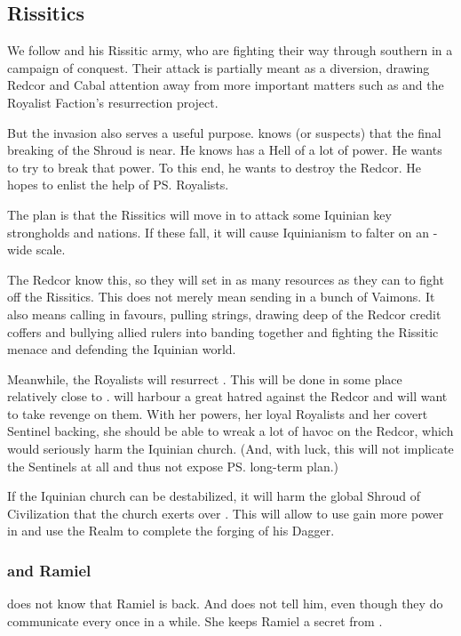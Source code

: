 \begin{garbage}
\subsection{Rissitics}
We follow \Narkiza{} and his Rissitic army, who are fighting their way through southern \Velcad{} in a campaign of conquest. 
Their attack is partially meant as a diversion, drawing Redcor and Cabal attention away from more important matters such as \Nithdornazsh{} and the Royalist Faction's resurrection project. 

But the invasion also serves a useful purpose. 
\Secherdamon{} knows (or suspects) that the final breaking of the Shroud is near. 
He knows \iquin{} has a Hell of a lot of power. 
He wants to try to break that power. 
To this end, he wants to destroy the Redcor. 
He hopes to enlist the help of \ps{\Shiaraid} Royalists. 

The plan is that the Rissitics will move in to attack some Iquinian key strongholds and nations. 
If these fall, it will cause Iquinianism to falter on an \Azmith-wide scale. 

The Redcor know this, so they will set in as many resources as they can to fight off the Rissitics. 
This does not merely mean sending in a bunch of Vaimons. 
It also means calling in favours, pulling strings, drawing deep of the Redcor credit coffers and bullying allied rulers into banding together and fighting the Rissitic menace and defending the Iquinian world.

Meanwhile, the Royalists will resurrect \Shiaraid. 
This will be done in some place relatively close to \Redce. 
\Shiaraid{} will harbour a great hatred against the Redcor and will want to take revenge on them. 
With her \sathariah{} powers, her loyal Royalists and her covert Sentinel backing, she should be able to wreak a lot of havoc on the Redcor, which would seriously harm the Iquinian church. 
(And, with luck, this will not implicate the Sentinels at all and thus not expose \ps{\Secherdamon} long-term plan.)

If the Iquinian church can be destabilized, it will harm the global Shroud of Civilization that the church exerts over \Azmith. 
This will allow \Secherdamon{} to use gain more power in \Azmith{} and use the Realm to complete the forging of his Dagger. 





\subsubsection{\Secherdamon{} and Ramiel}
\Secherdamon{} does not know that Ramiel is back. 
And \Shiaraid{} does not tell him, even though they do communicate every once in a while. 
She keeps Ramiel a secret from \Secherdamon.


\end{garbage}
